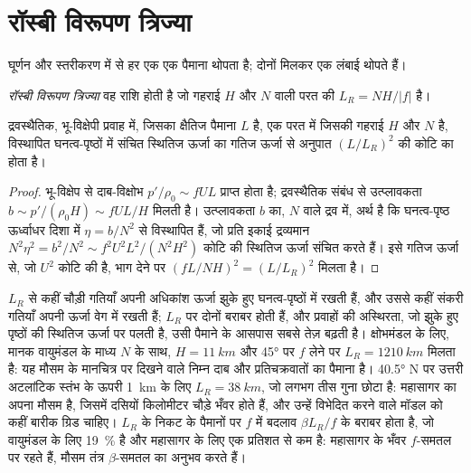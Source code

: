 \section{रॉस्बी विरूपण त्रिज्या}\label{sec:b3:gfd-foundations:rossby-radius}

घूर्णन और स्तरीकरण में से हर एक एक पैमाना थोपता है;
दोनों मिलकर एक लंबाई थोपते हैं।

\begin{definition}[रॉस्बी विरूपण त्रिज्या]\label{def:b3:gfd-foundations:rossby-radius}
\emph{रॉस्बी विरूपण त्रिज्या} वह राशि होती है
जो गहराई $H$ और  $N$ वाली परत की $L_R = NH/|f|$ है।
\end{definition}

\begin{proposition}[संतुलित प्रवाह की स्थितिज और गतिज ऊर्जा]\label{prop:b3:gfd-foundations:rossby-radius}
द्रवस्थैतिक, भू-विक्षेपी प्रवाह में, जिसका क्षैतिज पैमाना $L$ है, एक परत में
जिसकी गहराई $H$ और  $N$ है, विस्थापित घनत्व-पृष्ठों में संचित स्थितिज ऊर्जा का
गतिज ऊर्जा से अनुपात
$(L/L_R)^2$ की कोटि का होता है।
\end{proposition}

\begin{proof}
भू-विक्षेप से दाब-विक्षोभ $p'/\rho_0 \sim fUL$ प्राप्त होता है;
द्रवस्थैतिक संबंध से उत्प्लावकता $b \sim p'/(\rho_0H) \sim fUL/H$ मिलती है।
उत्प्लावकता $b$ का,  $N$ वाले द्रव में, अर्थ है कि घनत्व-पृष्ठ
ऊर्ध्वाधर दिशा में $\eta = b/N^2$ से विस्थापित हैं, जो प्रति इकाई
द्रव्यमान $N^2\eta^2 = b^2/N^2 \sim f^2U^2L^2/(N^2H^2)$ कोटि की स्थितिज ऊर्जा संचित करते हैं। इसे
गतिज ऊर्जा से, जो $U^2$ कोटि की है, भाग देने पर $(fL/NH)^2 = (L/L_R)^2$ मिलता है।
\end{proof}

$L_R$ से कहीं चौड़ी गतियाँ अपनी अधिकांश ऊर्जा झुके हुए घनत्व-पृष्ठों में रखती हैं, और
उससे कहीं संकरी गतियाँ अपनी ऊर्जा वेग में रखती हैं; $L_R$ पर दोनों
बराबर होती हैं, और  प्रवाहों की अस्थिरता, जो झुके हुए पृष्ठों की
स्थितिज ऊर्जा पर पलती है, उसी पैमाने के आसपास सबसे तेज़ बढ़ती है। क्षोभमंडल के लिए,
मानक वायुमंडल के माध्य $N$ के साथ, $H =
\qty{11}{km}$ और \ang{45} पर $f$ लेने पर $L_R = \qty{1210}{km}$ मिलता है: यह मौसम के मानचित्र पर दिखने वाले
निम्न दाब और प्रतिचक्रवातों का पैमाना है। \ang{40.5} N पर उत्तरी अटलांटिक स्तंभ के ऊपरी
\qty{1}{km} के लिए $L_R = \qty{38}{km}$, जो लगभग तीस गुना
छोटा है: महासागर का अपना मौसम है, जिसमें दसियों किलोमीटर चौड़े भँवर होते हैं,
और उन्हें विभेदित करने वाले मॉडल को कहीं बारीक ग्रिड चाहिए। $L_R$ के निकट के पैमानों पर
$f$ में बदलाव $\beta L_R/f$ के बराबर होता है, जो वायुमंडल के लिए \qty{19}{\percent} है
और महासागर के लिए एक प्रतिशत से कम है: महासागर के भँवर $f$-समतल पर रहते हैं,
मौसम तंत्र $\beta$-समतल का अनुभव करते हैं।

